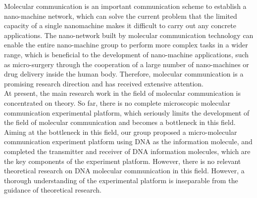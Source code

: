 \begin{abstract*}
Molecular communication is an important communication scheme to establish a nano-machine network, which can solve the current problem that the limited capacity of a single nanomachine makes it difficult to carry out any concrete applications. The nano-network built by molecular communication technology can enable the entire nano-machine group to perform more complex tasks in a wider range, which is beneficial to the development of nano-machine applications, such as micro-surgery through the cooperation of a large number of nano-machines or drug delivery inside the human body. Therefore, molecular communication is a promising research direction and has received extensive attention.\\

At present, the main research work in the field of molecular communication is concentrated on theory. So far, there is no complete microscopic molecular communication experimental platform, which seriously limits the development of the field of molecular communication and becomes a bottleneck in this field. Aiming at the bottleneck in this field, our group proposed a micro-molecular communication experiment platform using DNA as the information molecule, and completed the transmitter and receiver of DNA information molecules, which are the key components of the experiment platform. However, there is no relevant theoretical research on DNA molecular communication in this field. However, a thorough understanding of the experimental platform is inseparable from the guidance of theoretical research.\\


\end{abstract*}
